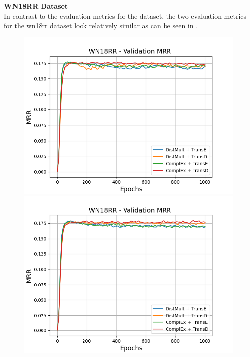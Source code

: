 \textbf{WN18RR Dataset}
\label{subsubsec:methods_wn18rr}\\
%
In contrast to the evaluation metrics for the \umls dataset, the two evaluation metrics for the wn18rr dataset look relatively similar as can be seen in .
\begin{figure}[H]
    \centering
    \begin{minipage}{.5\textwidth}
      \centering
      \includegraphics[width=0.9\linewidth]{figures/results/gan_train/not_pretrained/uncertainty/max/entropy/wn18rr/1k_epochs/uncertainty_wn18rr_mrrs.png}
    \end{minipage}%
    \begin{minipage}{.5\textwidth}
      \centering
      \includegraphics[width=0.9\linewidth]{figures/results/gan_train/not_pretrained/uncertainty/max_distribution/entropy/wn18rr/1k_epochs/uncertainty_wn18rr_mrrs.png}

\end{minipage}
\end{figure}
